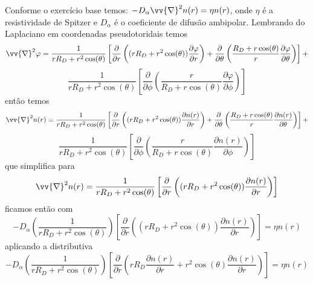 \documentclass[12pt,oneside,a4paper]{abntex2}
\begin{document}
Conforme o exercício base temos: $-D_\alpha \vv{\nabla}^2 n(r)=\eta n(r)$, onde $\eta$ é a resistividade de Spitzer e $D_\alpha$ é o coeficiente de difusão ambipolar. Lembrando do Laplaciano em coordenadas pseudotoridais temos
\begin{equation*}
\vv{\nabla}^2 \varphi = \frac{1}{r R_D + r^2 \cos(\theta)}  \left[  \dfrac{\partial}{\partial r} \left( (r R_D + r^2 \cos(\theta))\dfrac{\partial \varphi}{\partial r} \right)+\dfrac{\partial}{\partial \theta} \left( \frac{R_D + r\cos(\theta)}{r}\dfrac{\partial \varphi}{\partial \theta} \right)\right]+
\end{equation*}
\begin{equation*}
\frac{1}{r R_D + r^2 \cos(\theta)}  \left[ \dfrac{\partial}{\partial \phi} \left( \frac{r}{R_D + r\cos(\theta)}\dfrac{\partial \varphi}{\partial \phi} \right)  \right]
\end{equation*}
então temos
\begin{equation*}
\vv{\nabla}^2 n(r) = \frac{1}{r R_D + r^2 \cos(\theta)}  \left[  \dfrac{\partial}{\partial r} \left( (r R_D + r^2 \cos(\theta))\dfrac{\partial n(r)}{\partial r} \right)+\dfrac{\partial}{\partial \theta} \left( \frac{R_D + r\cos(\theta)}{r}\dfrac{\partial n(r)}{\partial \theta} \right)\right]+
\end{equation*}
\begin{equation*}
\frac{1}{r R_D + r^2 \cos(\theta)}  \left[ \dfrac{\partial}{\partial \phi} \left( \frac{r}{R_D + r\cos(\theta)}\dfrac{\partial n(r)}{\partial \phi} \right)  \right]
\end{equation*}
que simplifica para
\begin{equation*}
\vv{\nabla}^2 n(r) = \frac{1}{r R_D + r^2 \cos(\theta)}  \left[  \dfrac{\partial}{\partial r} \left( (r R_D + r^2 \cos(\theta))\dfrac{\partial n(r)}{\partial r} \right) \right]
\end{equation*}
ficamos então com
\begin{equation*}
-D_\alpha \left( \frac{1}{r R_D + r^2 \cos(\theta)} \right) \left[  \dfrac{\partial}{\partial r} \left( (r R_D + r^2 \cos(\theta))\dfrac{\partial n(r)}{\partial r} \right) \right] =\eta n(r)
\end{equation*}
aplicando a distributiva
\begin{equation*}
-D_\alpha \left( \frac{1}{r R_D + r^2 \cos(\theta)} \right) \left[ \dfrac{\partial}{\partial r} \left( r R_D \dfrac{\partial n(r)}{\partial r} + r^2 \cos(\theta)\dfrac{\partial n(r)}{\partial r} \right) \right] =\eta n(r)
\end{equation*}
\end{document}
